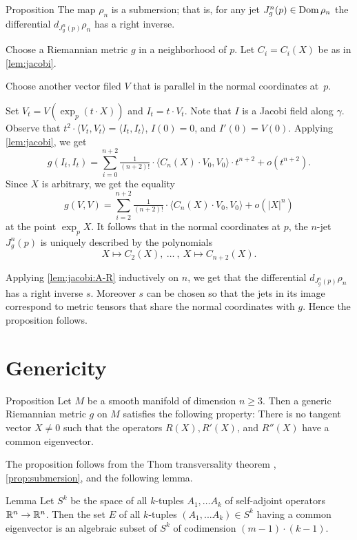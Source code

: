 \documentclass[a4paper,10pt]{article}
\begin{document}
\begin{thm}{Proposition}\label{prop:submersion}
The map $\rho_n$ is a submersion;
that is, for any jet $J^n_g(p)\z\in \Dom \rho_n$ the differential $d_{J^n_g(p)}\rho_n$ has a right inverse.
\end{thm}

Choose a Riemannian metric $g$ in a neighborhood of $p$.
Let $C_i=C_i(X)$ be as in \ref{lem:jacobi}.

Choose another vector filed $V$ that is parallel in the normal coordinates at~$p$.

Set $V_t=V(\exp_p(t\cdot X))$ and $I_t=t\cdot V_t$.
Note that $I$ is a Jacobi field along $\gamma$.
Observe that $t^2\cdot \langle V_t, V_t\rangle=\langle I_t, I_t\rangle$, $I(0)=0$, and $I'(0)=V(0)$.
Applying \ref{lem:jacobi}, we get
\[g(I_t, I_t)=\sum_{i=0}^{n+2}\tfrac1{(n+2)!}\cdot\langle C_n(X)\cdot V_0,V_0\rangle\cdot t^{n+2}+o(t^{n+2}).\]
Since $X$ is arbitrary, we get the equality
\[g( V, V)=\sum_{i=2}^{n+2}\tfrac1{(n+2)!}\cdot\langle C_n(X)\cdot V_0,V_0\rangle+o(|X|^{n})\]
at the point $\exp_p X$.
It follows that in the normal coordinates at $p$,
the $n$-jet $J^n_g(p)$ is uniquely described by the polynomials
\[X\mapsto C_2(X),
\ \dots\ ,\  
X\mapsto C_{n+2}(X).\]

Applying \ref{lem:jacobi:A-R} inductively on $n$, we get that the differential 
$d_{J^n_g(p)}\rho_n$ has a right inverse $s$.
Moreover $s$ can be chosen so that the jets in its image correspond to metric tensors that share the normal coordinates with $g$.
Hence the proposition follows.
\qeds 

\section{Genericity}

\begin{thm}{Proposition}
Let $M$ be a smooth manifold of dimension $n\ge 3$.
Then a generic Riemannian metric $g$ on $M$ satisfies the following property:
There is no tangent vector $X\ne 0$ such that the operators
$R(X), R'(X)$, and $R''(X)$ have a common eigenvector.
\end{thm}

The proposition follows from the Thom transversality theorem \cite[2.3.2]{eliashberg-mishachev}, \ref{prop:submersion}, and the following lemma.


\begin{thm}{Lemma}
Let $S^k$ be the space of all $k$-tuples $A_1,\dots A_k$ of self-adjoint operators $\mathbb{R}^n\to\mathbb{R}^n$.
Then the set $E$ of all $k$-tuples $(A_1,...A_k) \in S^k$  having a common eigenvector is an algebraic subset of $S^k$ of codimension $(m-1)\cdot (k-1)$.
\end{thm}
\end{document}
